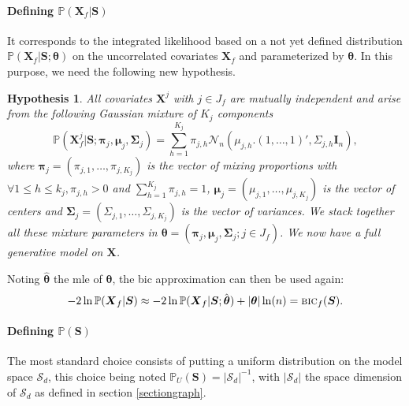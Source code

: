 \documentclass[12pt,a4paper]{report}
\newtheorem{hyp}{Hypothesis}
\begin{document}
\paragraph{Defining $\mathbb{P}(\boldsymbol{X}_f|\boldsymbol{S})$} It corresponds to the integrated likelihood based on a not yet defined distribution $\mathbb{P}(\boldsymbol{X}_f|\boldsymbol{S};\boldsymbol{\theta})$ on the uncorrelated covariates $\boldsymbol{X}_f$ and parameterized by $\boldsymbol{\theta}$. In this purpose, we need the following new hypothesis.

\begin{hyp}\label{H4}
All covariates $\boldsymbol{X}^j$ with $j \in J_f$ are mutually independent and arise from the following Gaussian mixture of $K_j$ components
\begin{equation}
\mathbb{P}(\boldsymbol{X}_f^j|\boldsymbol{S};\boldsymbol{\pi}_{j},\boldsymbol{\mu}_j,\boldsymbol{\Sigma}_j) = \sum_{h=1}^{K_j} \pi_{j,h} \mathcal{N}_n(\mu_{j,h} . (1,\ldots,1)',\Sigma_{j,h}\boldsymbol{I}_n),
\end{equation}
where $\boldsymbol{\pi}_{j}=(\pi_{j,1},\ldots,\pi_{j,K_j})$ is the vector of mixing proportions with $\forall 1\leq h\leq k_j , \pi_{j,h}>0$ and $\sum_{h=1}^{K_j}\pi_{j,h}=1$, $\boldsymbol{\mu}_j=(\mu_{j,1},\ldots,\mu_{j,K_j})$  is the vector of centers and $\boldsymbol{\Sigma}_j=(\Sigma_{j,1},\ldots,\Sigma_{j,K_j})$ is the vector of variances. We stack together all these mixture parameters in $\boldsymbol{\theta}=(\boldsymbol{\pi}_{j},\boldsymbol{\mu}_j,\boldsymbol{\Sigma}_j ; j \in J_f)$. We now have a full generative model on $\boldsymbol{X}$.

\end{hyp}
		 

\vspace{3mm}

Noting $\hat{\boldsymbol{\theta}}$ the {\sc mle} of $\boldsymbol{\theta}$, the {\sc bic} approximation can then be used again:
\begin{equation}
-2\ln \mathbb{P}(\boldsymbol{X}_f|\boldsymbol{S}) \approx -2\ln \mathbb{P}(\boldsymbol{X}_f|\boldsymbol{S};\hat{\boldsymbol{\theta}}) + |{\boldsymbol{\theta}}| \ln(n) = \mbox{{\sc bic}}_f(\boldsymbol{S}).
\end{equation}

\paragraph{Defining $\mathbb{P}(\boldsymbol{S})$} The most standard choice consists of putting a uniform distribution on the model space $\mathcal{S}_d$, this choice being noted $\mathbb{P}_U(\boldsymbol{S}) = |\mathcal{S}_d|^{-1}$, with $|\mathcal{S}_d|$ the space dimension of $\mathcal{S}_d$ as defined in section \ref{sectiongraph}.
		
\end{document}
